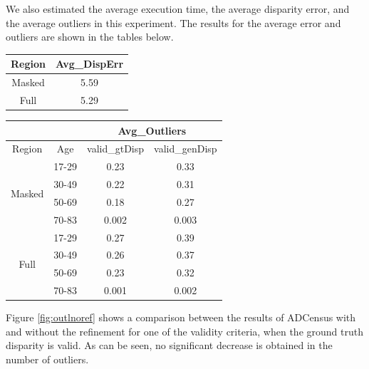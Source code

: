 We also estimated the average execution time, the average disparity error, and the average outliers in this experiment. The results for 
the average error and outliers are shown in the tables below. \newline

\begin{minipage}{\linewidth}
\begin{center}
\label{tab:adcerrNref}
\begin{tabular}{|c|c|}
\hline
Region & Avg\_DispErr \\ \hline
Masked & 5.59 \\  \hline
Full & 5.29 \\ \hline
\end{tabular}
\end{center}
\end{minipage} \newline

\begin{minipage}{\linewidth}
\begin{center}
\label{tab:adcoutlNref}
\begin{tabular}{ |c|c|c|c| }
\hline
\multicolumn{2}{|c}{} & \multicolumn{2}{|c|}{Avg\_Outliers} \\
\hline
Region & Age &  valid\_gtDisp & valid\_genDisp \\ \hline
\multirow{4}{*}{Masked} & 17-29 & 0.23 & 0.33 \\
& 30-49 & 0.22 & 0.31 \\
& 50-69 & 0.18 & 0.27 \\
& 70-83 & 0.002 & 0.003 \\ \hline
\multirow{4}{*}{Full} & 17-29 & 0.27 & 0.39 \\
& 30-49 & 0.26 & 0.37 \\
& 50-69 & 0.23 & 0.32 \\
& 70-83 & 0.001 & 0.002 \\ \hline
\end{tabular}
\end{center}
\end{minipage} \newline

Figure \ref{fig:outlnoref} shows a comparison between the results of ADCensus with and without the refinement 
for one of the validity criteria, when the ground truth disparity is valid. As can be seen, no significant decrease is obtained in the number of outliers.

